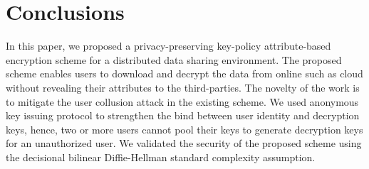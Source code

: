 \documentclass[10pt,journal]{IEEEtran}
\begin{document}
\section{Conclusions}
In this paper, we proposed a privacy-preserving key-policy attribute-based encryption scheme for a distributed data sharing environment. The proposed scheme enables users to download and decrypt the data from online such as cloud without revealing their attributes to the third-parties. The novelty of the work is to mitigate the user collusion attack in the existing scheme. We used anonymous key issuing protocol to strengthen the bind between user identity and decryption keys, hence,  two or more users cannot pool their keys to generate decryption keys for an unauthorized user. We validated the security of the proposed scheme using the decisional bilinear Diffie-Hellman standard complexity assumption.
\balance
\end{document}
